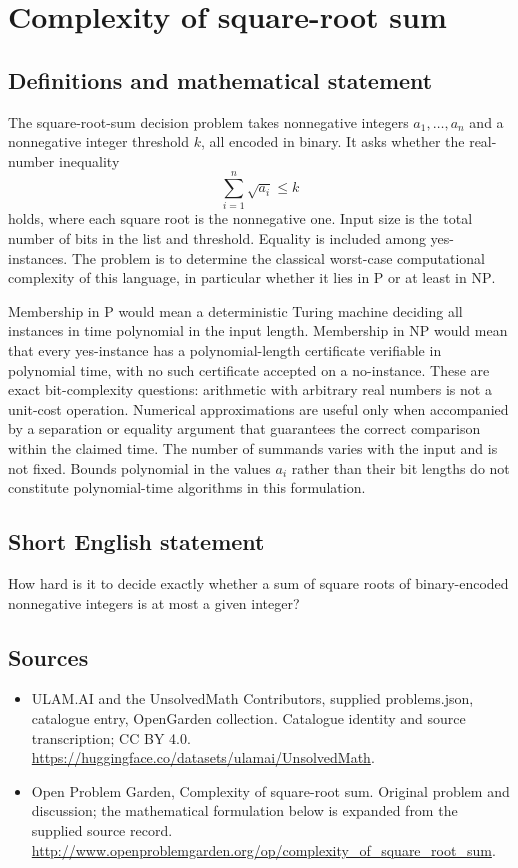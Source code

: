 \documentclass[11pt,a4paper]{article}
\begin{document}
\section*{Complexity of square-root sum}\label{statement}

\subsection{Definitions and mathematical statement}
The square-root-sum decision problem takes nonnegative integers
$a_1,\ldots,a_n$ and a nonnegative integer threshold $k$, all encoded
in binary. It asks whether the real-number inequality
\[
                            \sum_{i=1}^n\sqrt{a_i}\le k
\]
holds, where each square root is the nonnegative one. Input size is
the total number of bits in the list and threshold. Equality is
included among yes-instances. The problem is to determine the
classical worst-case computational complexity of this language,
in particular whether it lies in $\mathrm P$ or at least in
$\mathrm{NP}$.

Membership in $\mathrm P$ would mean a deterministic Turing machine
deciding all instances in time polynomial in the input length.
Membership in $\mathrm{NP}$ would mean that every yes-instance has
a polynomial-length certificate verifiable in polynomial time, with
no such certificate accepted on a no-instance.
These are exact bit-complexity questions: arithmetic with arbitrary
real numbers is not a unit-cost operation. Numerical approximations
are useful only when accompanied by a separation or equality argument
that guarantees the correct comparison within the claimed time.
The number of summands varies with the input and is not fixed.
Bounds polynomial in the values $a_i$ rather than their bit lengths
do not constitute polynomial-time algorithms in this formulation.
\subsection{Short English statement}
How hard is it to decide exactly whether a sum of square roots of binary-encoded nonnegative integers is at most a given integer?
\subsection{Sources}
\begin{itemize}
\item[S1] ULAM.AI and the UnsolvedMath Contributors, supplied problems.json, catalogue entry, OpenGarden collection. Catalogue identity and source transcription; CC BY 4.0.
\url{https://huggingface.co/datasets/ulamai/UnsolvedMath}.
\item[S2] Open Problem Garden, Complexity of square-root sum. Original problem and discussion; the mathematical formulation below is expanded from the supplied source record.
\url{http://www.openproblemgarden.org/op/complexity_of_square_root_sum}.
\end{itemize}
\end{document}
